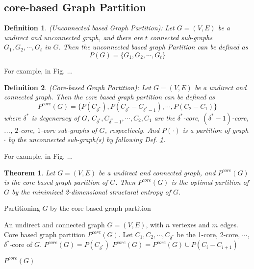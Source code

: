 \documentclass[10pt, conference, letterpaper]{IEEEtran}
\newtheorem{theorem}{Theorem}
\newtheorem{definition}{Definition}
\begin{document}
\subsection{core-based Graph Partition}

\begin{definition}\label{def:unconnected_partition}
	(Unconnected based Graph Partition): Let $G=(V,E)$ be a undirect and unconnected graph, and there are $t$ connected sub-graphs $G_1, G_2,\cdots, G_t$ in $G$. Then the unconnected based graph Partition can be defined as
	\begin{equation}
	P(G)=\{G_1, G_2,\cdots, G_t\}
	\end{equation} 
\end{definition}

For example, in Fig. ...

\begin{definition}
	(Core-based Graph Partition): Let $G=(V,E)$ be a undirect and connected graph. Then the core based graph partition can be defined as
	\begin{equation}
	\label{eq:core-based-partition}
	P^{core}(G)=\{P(C_{\delta^*}),P(C_{\delta^*}-C_{\delta^*-1}),\cdots, P(C_{2}-C_{1})\}
	\end{equation} 
	where $\delta^*$ is degeneracy of $G$, $C_{\delta^*},C_{\delta^*-1},\cdots,C_{2},C_{1}$ are the $\delta^*$-core, $(\delta^*-1)$-core, ...,  $2$-core, $1$-core sub-graphs of $G$, respectively. And $P(\cdot)$ is a partition of graph $\cdot$ by the unconnected sub-graph(s) by following Def. \ref{def:unconnected_partition}.
\end{definition}

For example, in Fig. ...


\begin{theorem}
	Let $G=(V,E)$ be a undirect and connected graph, and $P^{core}(G)$ is the core based graph partition of $G$. Then $P^{core}(G)$ is the optimal partition of $G$ by the minimized 2-dimensional structural entropy of $G$.
\end{theorem}

\begin{algorithm}  
	\caption{Partitioning $G$ by the core based graph partition}  
	\begin{algorithmic}[1] %
		\Require An undirect and connected graph $G=(V,E)$, with $n$ vertexes and $m$ edges.
		\Ensure Core based graph partition $P^{core}(G)$.
		\State Let $C_1, C_2, \cdots, C_{\delta^*}$ be the 1-core, 2-core, $\cdots$, $\delta^*$-core of $G$.
		\State $P^{core}(G)= P(C_{\delta^*})$
		\State $P^{core}(G)=P^{core}(G) \cup P(C_i-C_{i+1})$
		\EndFor
	\end{algorithmic} 
	\Return $P^{core}(G)$
\end{algorithm} 
\end{document}

